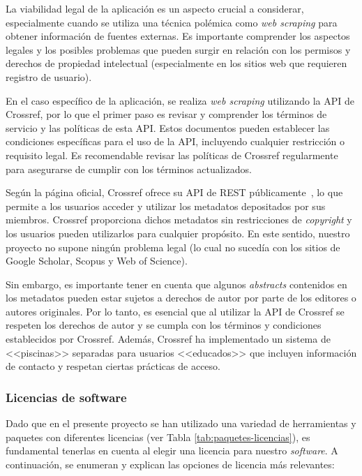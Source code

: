La viabilidad legal de la aplicación es un aspecto crucial a considerar, especialmente cuando se utiliza una técnica polémica como \textit{web scraping} para obtener información de fuentes externas. Es importante comprender los aspectos legales y los posibles problemas que pueden surgir en relación con los permisos y derechos de propiedad intelectual (especialmente en los sitios web que requieren registro de usuario).

En el caso específico de la aplicación, se realiza \textit{web scraping} utilizando la API de Crossref, por lo que el primer paso es revisar y comprender los términos de servicio y las políticas de esta API. Estos documentos pueden establecer las condiciones específicas para el uso de la API, incluyendo cualquier restricción o requisito legal. Es recomendable revisar las políticas de Crossref regularmente para asegurarse de cumplir con los términos actualizados. 

Según la página oficial, Crossref ofrece su API de REST públicamente~\cite{Rosa2020}, lo que permite a los usuarios acceder y utilizar los metadatos depositados por sus miembros. Crossref proporciona dichos metadatos sin restricciones de \textit{copyright} y los usuarios pueden utilizarlos para cualquier propósito. En este sentido, nuestro proyecto no supone ningún problema legal (lo cual no sucedía con los sitios de Google Scholar, Scopus y Web of Science).

Sin embargo, es importante tener en cuenta que algunos \textit{abstracts} contenidos en los metadatos pueden estar sujetos a derechos de autor por parte de los editores o autores originales. Por lo tanto, es esencial que al utilizar la API de Crossref se respeten los derechos de autor y se cumpla con los términos y condiciones establecidos por Crossref. Además, Crossref ha implementado un sistema de <<piscinas>> separadas para usuarios <<educados>> que incluyen información de contacto y respetan ciertas prácticas de acceso.

\newpage
\subsubsection{Licencias de software}

Dado que en el presente proyecto se han utilizado una variedad de herramientas y paquetes con diferentes licencias (ver Tabla \ref{tab:paquetes-licencias}), es fundamental tenerlas en cuenta al elegir una licencia para nuestro \textit{software}. A continuación, se enumeran y explican las opciones de licencia más relevantes:

